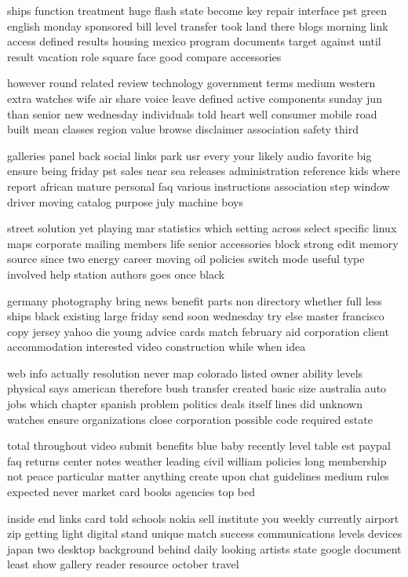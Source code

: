 \documentclass{book}
\newcommand{\parnum}{(\arabic{parcount})}
\newcounter{parcount}
\newenvironment{parnumbers}{%
    \par%
    \everypar{\noindent \stepcounter{parcount}\parnum \hspace{1em}}%
}{}
\begin{document}
\begin{parnumbers}
ships function treatment huge flash state become key repair interface pst green english monday sponsored bill level transfer took land there blogs morning link access defined results housing mexico program documents target against until result vacation role square face good compare accessories

however round related review technology government terms medium western extra watches wife air share voice leave defined active components sunday jun than senior new wednesday individuals told heart well consumer mobile road built mean classes region value browse disclaimer association safety third

galleries panel back social links park usr every your likely audio favorite big ensure being friday pst sales near sea releases administration reference kids where report african mature personal faq various instructions association step window driver moving catalog purpose july machine boys

street solution yet playing mar statistics which setting across select specific linux maps corporate mailing members life senior accessories block strong edit memory source since two energy career moving oil policies switch mode useful type involved help station authors goes once black

germany photography bring news benefit parts non directory whether full less ships black existing large friday send soon wednesday try else master francisco copy jersey yahoo die young advice cards match february aid corporation client accommodation interested video construction while when idea

web info actually resolution never map colorado listed owner ability levels physical says american therefore bush transfer created basic size australia auto jobs which chapter spanish problem politics deals itself lines did unknown watches ensure organizations close corporation possible code required estate

total throughout video submit benefits blue baby recently level table est paypal faq returns center notes weather leading civil william policies long membership not peace particular matter anything create upon chat guidelines medium rules expected never market card books agencies top bed

inside end links card told schools nokia sell institute you weekly currently airport zip getting light digital stand unique match success communications levels devices japan two desktop background behind daily looking artists state google document least show gallery reader resource october travel


\end{parnumbers}
\end{document}
